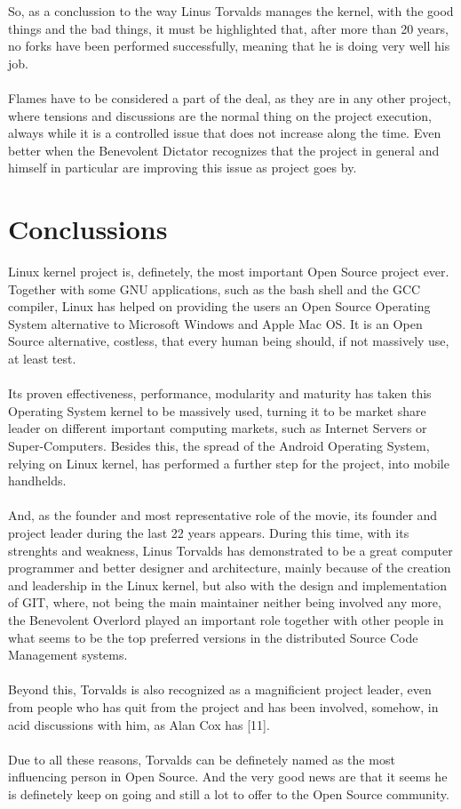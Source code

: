 \documentclass[11pt]{article}
\begin{document}
So, as a conclussion to the way Linus Torvalds manages the kernel, with the good things and the bad things, it must be highlighted that, after more than 20 years, no forks have been performed successfully, meaning that he is doing very well his job.\\
\\Flames have to be considered a part of the deal, as they are in any other project, where tensions and discussions are the normal thing on the project execution, always while it is a controlled issue that does not increase along the time. Even better when the Benevolent Dictator recognizes that the project in general and himself in particular are improving this issue as project goes by.

\pagebreak

\section{Conclussions}
Linux kernel project is, definetely, the most important Open Source project ever. Together with some GNU applications, such as the bash shell and the GCC compiler, Linux has helped on providing the users an Open Source Operating System alternative to Microsoft Windows and Apple Mac OS. It is an Open Source alternative, costless, that every human being should, if not massively use, at least test.\\
\\
Its proven effectiveness, performance, modularity and maturity has taken this Operating System kernel to be massively used, turning it to be market share leader on different important computing markets, such as Internet Servers or Super-Computers. Besides this, the spread of the Android Operating System, relying on Linux kernel, has performed a further step for the project, into mobile handhelds.\\
\\
And, as the founder and most representative role of the movie, its founder and project leader during the last 22 years appears. During this time, with its strenghts and weakness, Linus Torvalds has demonstrated to be a great computer programmer and better designer and architecture, mainly because of the creation and leadership in the Linux kernel, but also with the design and implementation of GIT, where, not being the main maintainer neither being involved any more, the Benevolent Overlord played an important role together with other people in what seems to be the top preferred versions in the distributed Source Code Management systems.\\
\\
Beyond this, Torvalds is also recognized as a magnificient project leader, even from people who has quit from the project and has been involved, somehow, in acid discussions with him, as Alan Cox has [11].\\
\\
Due to all these reasons, Torvalds can be definetely named as the most influencing person in Open Source. And the very good news are that it seems he is definetely keep on going and still a lot to offer to the Open Source community.
\end{document}
